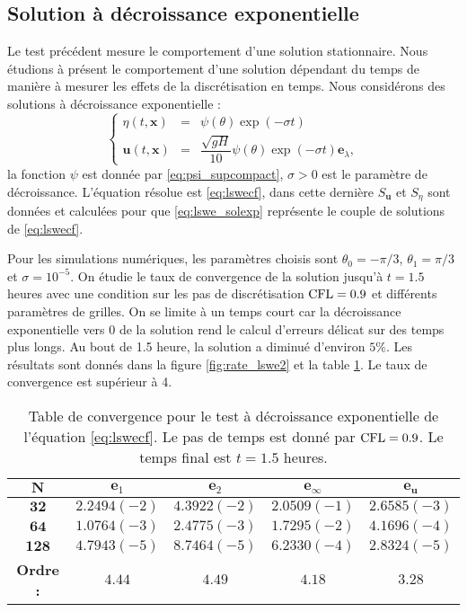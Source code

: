 \subsection{Solution à décroissance exponentielle}

Le test précédent mesure le comportement d'une solution stationnaire. Nous étudions à présent le comportement d'une solution dépendant du temps de manière à mesurer les effets de la discrétisation en temps. Nous considérons des solutions à décroissance exponentielle :
\begin{equation}
\left\lbrace
\begin{array}{rcl}
\eta(t,\mathbf{x}) & = & \psi(\theta) \exp \left( - \sigma t \right)\\
\mathbf{u}(t,\mathbf{x}) & = & \dfrac{\sqrt{gH}}{10} \psi(\theta) \exp \left( - \sigma t \right) \mathbf{e}_{\lambda},
\end{array}
\right.
\label{eq:lswe_solexp}
\end{equation}
la fonction $\psi$ est donnée par \eqref{eq:psi_supcompact}, $\sigma>0$ est le paramètre de décroissance. L'équation résolue est \eqref{eq:lswecf}, dans cette dernière $S_{\mathbf{u}}$ et $S_{\eta}$ sont données et calculées pour que \eqref{eq:lswe_solexp} représente le couple de solutions de \eqref{eq:lswecf}.

Pour les simulations numériques, les paramètres choisis sont $\theta_0 = - \pi /3$, $\theta_1 = \pi /3$ et $\sigma = 10^{-5}$. On étudie le taux de convergence de la solution jusqu'à $t=1.5$ heures avec une condition sur les pas de discrétisation $\text{CFL}=0.9$ et différents paramètres de grilles. 
On se limite à un temps court car la décroissance exponentielle vers 0 de la solution rend le calcul d'erreurs délicat sur des temps plus longs. Au bout de 1.5 heure, la solution a diminué d'environ $5\%$.
Les résultats sont donnés dans la figure \ref{fig:rate_lswe2} et la table \ref{tab:rate_lswe2}. Le taux de convergence est supérieur à 4.

\begin{table}[htbp]
\begin{center}
\begin{tabular}{|c||c|c|c|c|}
\hline 
$\mathbf{N}$ & $\mathbf{e}_1$ & $\mathbf{e}_2$ & $\mathbf{e}_{\infty}$ & $\mathbf{e}_{\mathbf{u}}$\\ 
\hline 
\hline 
$\mathbf{32}$ & $2.2494(-2)$ & $4.3922(-2)$ & $2.0509(-1)$ & $2.6585(-3)$\\ 

$\mathbf{64}$ & $1.0764(-3)$ & $2.4775(-3)$ & $1.7295(-2)$ & $4.1696(-4)$\\ 

$\mathbf{128}$ & $4.7943(-5)$ & $8.7464(-5)$ & $6.2330(-4)$ & $2.8324(-5)$\\

\hline
\textbf{Ordre :} & $4.44$ & $4.49$ & $4.18$ & $3.28$ \\ 
\hline
\end{tabular} 
\end{center}
\caption{Table de convergence pour le test à décroissance exponentielle de l'équation \eqref{eq:lswecf}. Le pas de temps est donné par $\text{CFL}=0.9$. Le temps final est $t=1.5$ heures.}
\label{tab:rate_lswe2}
\end{table}



